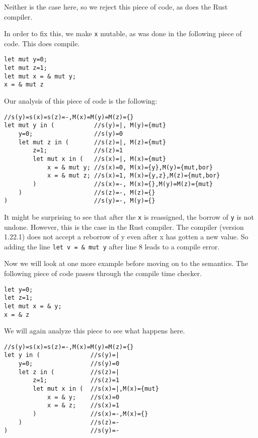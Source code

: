 Neither is the case here, so we reject this piece of code, as does the Rust compiler. 

In order to fix this, we make \texttt{x} mutable, as was done in the following piece of code. This does compile.

\begin{verbatim}
let mut y=0;
let mut z=1;
let mut x = & mut y; 
x = & mut z
\end{verbatim}

Our analysis of this piece of code is the following: 

\begin{verbatim}
//s(y)=s(x)=s(z)=-,M(x)=M(y)=M(z)={}
let mut y in (           //s(y)=|, M(y)={mut}
    y=0;                 //s(y)=0
    let mut z in (       //s(z)=|, M(z)={mut}
        z=1;             //s(z)=1
        let mut x in (   //s(x)=|, M(x)={mut}
            x = & mut y; //s(x)=0, M(x)={y},M(y)={mut,bor}
            x = & mut z; //s(x)=1, M(x)={y,z},M(z)={mut,bor}
        )                //s(x)=-, M(x)={},M(y)=M(z)={mut}
    )                    //s(z)=-, M(z)={}
)                        //s(y)=-, M(y)={}
\end{verbatim}

It might be surprising to see that after the \texttt{x} is reassigned, the borrow of \texttt{y} is not undone. However, this is the case in the Rust compiler. The compiler (version 1.22.1) does not accept a reborrow of y even after x has gotten a new value. So adding the line \texttt{let v = \& mut y} after line 8 leads to a compile error. 

Now we will look at one more example before moving on to the semantics. The following piece of code passes through the compile time checker.

\begin{verbatim}
let y=0;
let z=1;
let mut x = & y; 
x = & z
\end{verbatim}

We will again analyze this piece to see what happens here. 

\begin{verbatim}
//s(y)=s(x)=s(z)=-,M(x)=M(y)=M(z)={}
let y in (              //s(y)=|
    y=0;                //s(y)=0
    let z in (          //s(z)=|
        z=1;            //s(z)=1
        let mut x in (  //s(x)=|,M(x)={mut}
            x = & y;    //s(x)=0
            x = & z;    //s(x)=1
        )               //s(x)=-,M(x)={}
    )                   //s(z)=-
)                       //s(y)=-
\end{verbatim}

